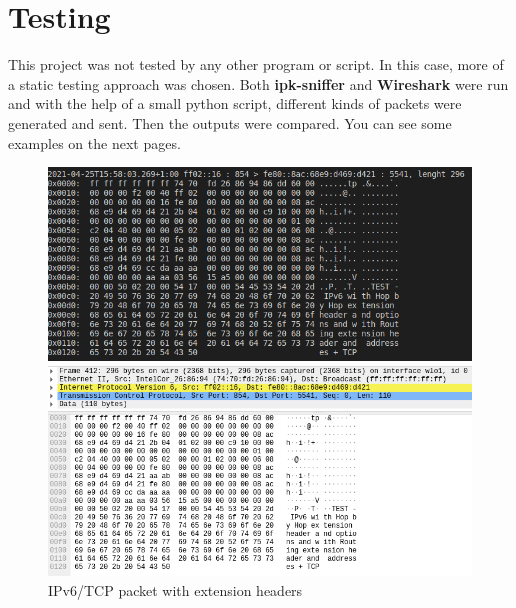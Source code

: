 \documentclass[a4paper,12pt]{article}
\begin{document}
\section{Testing}
This project was not tested by any other program or script. In this case, more of a static testing approach was chosen. Both \textbf{ipk-sniffer} and \textbf{Wireshark} were run and with the help of a small python script, different kinds of packets were generated and sent. Then the outputs were compared. You can see some examples on the next pages.
\newpage
\begin{figure}[H]

            \vfill
            
            \begin{center}

            \includegraphics[width=\linewidth]{cmp1ipk.png}
            
            \vspace{0.5cm}
            
            \includegraphics[width=\linewidth]{cmp1wireshark.png}
            \caption{IPv6/TCP packet with extension headers}
            \end{center}
            
            \vfill
            
\end{figure}
\end{document}

